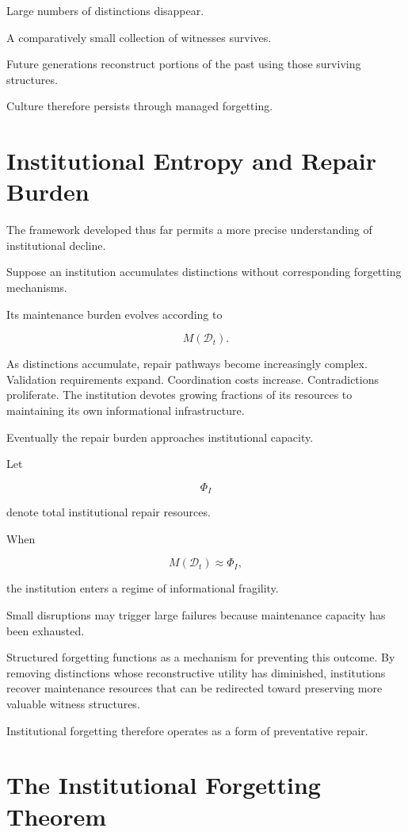 \documentclass[12pt,oneside]{book}
\theoremstyle{plain} \newtheorem{theorem}{Theorem}[chapter] \newtheorem{lemma}[theorem]{Lemma} \newtheorem{proposition}[theorem]{Proposition} \newtheorem{corollary}[theorem]{Corollary}
\theoremstyle{definition} \newtheorem{definition}[theorem]{Definition} \newtheorem{axiom}[theorem]{Axiom} \newtheorem{construction}[theorem]{Construction}
\theoremstyle{remark} \newtheorem{remark}[theorem]{Remark} \newtheorem{example}[theorem]{Example}
\newcommand{\D}{\mathcal{D}} \newcommand{\R}{\mathcal{R}} \newcommand{\F}{\mathcal{F}} \newcommand{\U}{\mathcal{U}} \newcommand{\M}{\mathcal{M}} \newcommand{\G}{\Gamma}
\begin{document}
Large numbers of distinctions disappear.

A comparatively small collection of witnesses survives.

Future generations reconstruct portions of the past using those surviving structures.

Culture therefore persists through managed forgetting.

\section{Institutional Entropy and Repair Burden}

The framework developed thus far permits a more precise understanding of institutional decline.

Suppose an institution accumulates distinctions without corresponding forgetting mechanisms.

Its maintenance burden evolves according to

\[
M(\D_t).
\]

As distinctions accumulate, repair pathways become increasingly complex. Validation requirements expand. Coordination costs increase. Contradictions proliferate. The institution devotes growing fractions of its resources to maintaining its own informational infrastructure.

Eventually the repair burden approaches institutional capacity.

Let

\[
\Phi_I
\]

denote total institutional repair resources.

When

\[
M(\D_t)
\approx
\Phi_I,
\]

the institution enters a regime of informational fragility.

Small disruptions may trigger large failures because maintenance capacity has been exhausted.

Structured forgetting functions as a mechanism for preventing this outcome. By removing distinctions whose reconstructive utility has diminished, institutions recover maintenance resources that can be redirected toward preserving more valuable witness structures.

Institutional forgetting therefore operates as a form of preventative repair.

\section{The Institutional Forgetting Theorem}
\end{document}
